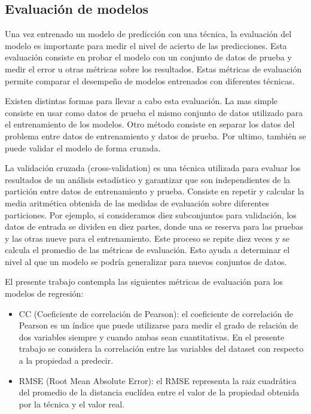 \subsection{Evaluación de modelos}

Una vez entrenado un modelo de predicción con una técnica, la evaluación
del modelo es importante para medir el nivel de acierto de las predicciones.
Esta evaluación consiste en probar el modelo con un conjunto de datos
de prueba y medir el error u otras métricas sobre los resultados.
Estas métricas de evaluación permite comparar el desempeño de modelos
entrenados con diferentes técnicas. 

Existen distintas formas para llevar a cabo esta evaluación. La mas
simple consiste en usar como datos de prueba el mismo conjunto de
datos utilizado para el entrenamiento de los modelos. Otro método
consiste en separar los datos del problema entre datos de entrenamiento
y datos de prueba. Por ultimo, también se puede validar el modelo
de forma cruzada. 

La validación cruzada (cross-validation) es una técnica utilizada
para evaluar los resultados de un análisis estadístico y garantizar
que son independientes de la partición entre datos de entrenamiento
y prueba. Consiste en repetir y calcular la media aritmética obtenida
de las medidas de evaluación sobre diferentes particiones. Por ejemplo,
si consideramos diez subconjuntos para validación, los datos de entrada
se dividen en diez partes, donde una se reserva para las pruebas y
las otras nueve para el entrenamiento. Este proceso se repite diez
veces y se calcula el promedio de las métricas de evaluación. Esto
ayuda a determinar el nivel al que un modelo se podría generalizar
para nuevos conjuntos de datos. 

El presente trabajo contempla las siguientes métricas de evaluación
para los modelos de regresión: 
\begin{itemize}
\item CC (Coeficiente de correlación de Pearson): el coeficiente de correlación
de Pearson es un índice que puede utilizarse para medir el grado de
relación de dos variables siempre y cuando ambas sean cuantitativas.
En el presente trabajo se considera la correlación entre las variables
del dataset con respecto a la propiedad a predecir.
\item RMSE (Root Mean Absolute Error): el \ac{RMSE} representa la raiz
cuadrática del promedio de la distancia euclídea entre el valor de
la propiedad obtenida por la técnica y el valor real. 
\end{itemize}


